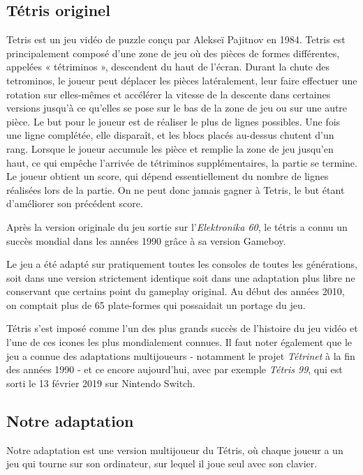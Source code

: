 \documentclass[a4paper, 12pt]{article}
\begin{document}
	\subsection{Tétris originel}
		Tetris est un jeu vidéo de puzzle conçu par Alekseï Pajitnov en 1984. Tetris est principalement composé d'une zone de jeu où des pièces de formes différentes, appelées « tétriminos », descendent du haut de l'écran. 
		Durant la chute des tetrominos, le joueur peut déplacer les pièces latéralement, leur faire effectuer une rotation sur elles-mêmes et accélérer la vitesse de la descente dans certaines versions jusqu'à ce qu'elles se pose sur le bas de la zone de jeu ou sur une autre pièce. 
		Le but pour le joueur est de réaliser le plus de lignes possibles. Une fois une ligne complétée, elle disparaît, et les blocs placés au-dessus chutent d'un rang. 
		Lorsque le joueur accumule les pièce et remplie la zone de jeu jusqu’en haut, ce qui empêche l'arrivée de tétriminos supplémentaires, la partie se termine. Le joueur obtient un score, qui dépend essentiellement du nombre de lignes réalisées lors de la partie. On ne peut donc jamais gagner à Tetris, le but étant d’améliorer son précédent score.

		Après la version originale du jeu sortie sur l'\textit{Elektronika 60}, le tétris a connu un succès mondial dans les années 1990 grâce à sa version Gameboy.

		Le jeu a été adapté sur pratiquement toutes les consoles de toutes les générations, soit dans une version strictement identique soit dans une adaptation plus libre ne conservant que certains point du gameplay original. Au début des années 2010, on comptait plus de 65 plate-formes qui possaidait un portage du jeu.

		Tétris s'est imposé comme l'un des plus grands succès de l'histoire du jeu vidéo et l'une de ces icones les plus mondialement connues. Il faut noter également que le jeu a connue des adaptations multijoueurs - notamment le projet \emph{Tétrinet} à la fin des années 1990 - et ce encore aujourd'hui, avec par exemple \emph{Tétris 99}, qui est sorti le 13 février 2019 sur Nintendo Switch.

	\subsection{Notre adaptation}
		Notre adaptation est une version multijoueur du Tétris, où chaque joueur a un jeu qui tourne sur son ordinateur, sur lequel il joue seul avec son clavier. 
\end{document}
